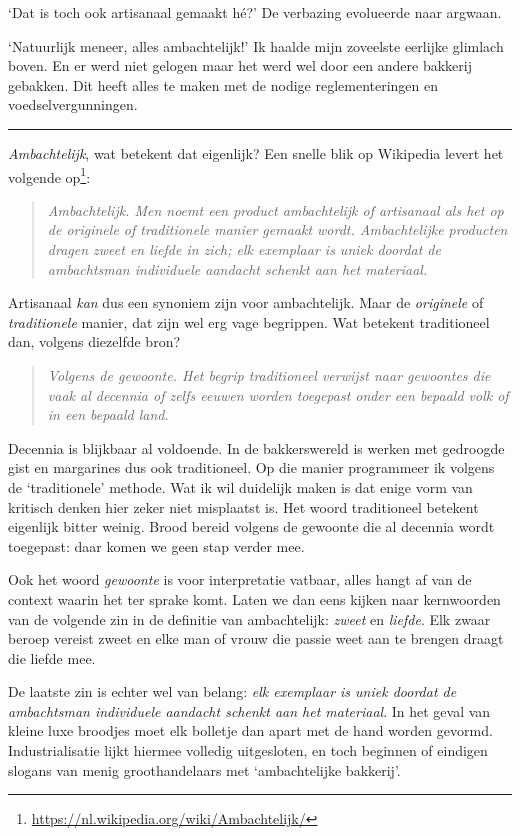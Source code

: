 \documentclass[
  11pt,
  dutch,
]{memoir}
\begin{document}
`Dat is toch ook artisanaal gemaakt hé?' De verbazing evolueerde naar
argwaan.

`Natuurlijk meneer, alles ambachtelijk!' Ik haalde mijn zoveelste
eerlijke glimlach boven. En er werd niet gelogen maar het werd wel door
een andere bakkerij gebakken. Dit heeft alles te maken met de nodige
reglementeringen en voedselvergunningen.

\pfbreak

\emph{Ambachtelijk}, wat betekent dat eigenlijk? Een snelle blik op
Wikipedia levert het volgende op\footnote{\url{https://nl.wikipedia.org/wiki/Ambachtelijk/}}:

\begin{quote}
\emph{Ambachtelijk. Men noemt een product ambachtelijk of artisanaal als
het op de originele of traditionele manier gemaakt wordt. Ambachtelijke
producten dragen zweet en liefde in zich; elk exemplaar is uniek doordat
de ambachtsman individuele aandacht schenkt aan het materiaal.}
\end{quote}

Artisanaal \emph{kan} dus een synoniem zijn voor ambachtelijk. Maar de
\emph{originele} of \emph{traditionele} manier, dat zijn wel erg vage
begrippen. Wat betekent traditioneel dan, volgens diezelfde bron?

\begin{quote}
\emph{Volgens de gewoonte. Het begrip traditioneel verwijst naar
gewoontes die vaak al decennia of zelfs eeuwen worden toegepast onder
een bepaald volk of in een bepaald land.}
\end{quote}

Decennia is blijkbaar al voldoende. In de bakkerswereld is werken met
gedroogde gist en margarines dus ook traditioneel. Op die manier
programmeer ik volgens de `traditionele' methode. Wat ik wil duidelijk
maken is dat enige vorm van kritisch denken hier zeker niet misplaatst
is. Het woord traditioneel betekent eigenlijk bitter weinig. Brood
bereid volgens de gewoonte die al decennia wordt toegepast: daar komen
we geen stap verder mee.

Ook het woord \emph{gewoonte} is voor interpretatie vatbaar, alles hangt
af van de context waarin het ter sprake komt. Laten we dan eens kijken
naar kernwoorden van de volgende zin in de definitie van ambachtelijk:
\emph{zweet} en \emph{liefde}. Elk zwaar beroep vereist zweet en elke
man of vrouw die passie weet aan te brengen draagt die liefde mee.

De laatste zin is echter wel van belang: \emph{elk exemplaar is uniek
doordat de ambachtsman individuele aandacht schenkt aan het materiaal}.
In het geval van kleine luxe broodjes moet elk bolletje dan apart met de
hand worden gevormd. Industrialisatie lijkt hiermee volledig
uitgesloten, en toch beginnen of eindigen slogans van menig
groothandelaars met `ambachtelijke bakkerij'.
\end{document}
